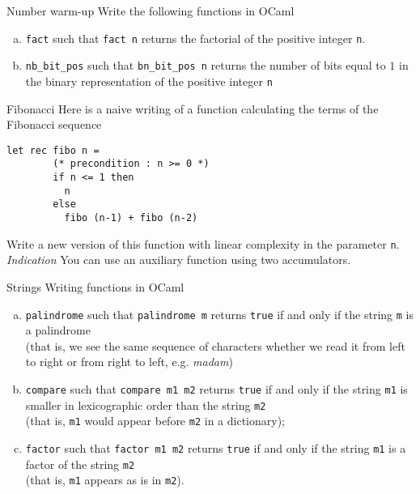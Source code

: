 \begin{problem}{Number warm-up}{}
    Write the following functions in OCaml
    
    \begin{enumerate}[(a)]
        \item \lstinline|fact| such that \lstinline|fact n| returns the factorial of the positive integer \lstinline|n|.
        
        \item \lstinline|nb_bit_pos| such that \lstinline|bn_bit_pos n| returns the number of bits equal to $1$ in the binary representation of the positive integer \lstinline|n|
    \end{enumerate}
\end{problem}

\begin{problem}{Fibonacci}{}
    Here is a naive writing of a function calculating the terms of the Fibonacci sequence
    
    \begin{lstlisting}[style=caml]
      let rec fibo n =
        (* precondition : n >= 0 *)
        if n <= 1 then 
          n
        else 
          fibo (n-1) + fibo (n-2)
\end{lstlisting}
    Write a new version of this function with linear complexity in the parameter \lstinline|n|.
    \textit{Indication} You can use an auxiliary function using two accumulators.
    
\end{problem}

\begin{problem}{Strings}{}
    Writing functions in OCaml
    \begin{enumerate}[(a)]
        \item \lstinline|palindrome| such that \lstinline|palindrome m| returns \lstinline|true| if and only if the string \lstinline|m| is a palindrome\\
        (that is, we see the same sequence of characters whether we read it from left to right
        or from right to left, e.g. \textit{madam})
        \item \lstinline|compare| such that \lstinline|compare m1 m2| returns \lstinline|true| if and only if the string \lstinline|m1| is smaller in lexicographic order than the string \lstinline|m2|\\ 
        (that is, \lstinline|m1| would appear before \lstinline|m2| in a dictionary);
        \item \lstinline|factor| such that \lstinline|factor m1 m2| returns \lstinline|true| if and only if the string \lstinline|m1| is a factor of the string \lstinline|m2|\\ 
        (that is, \lstinline|m1| appears as is in \lstinline|m2|).
    \end{enumerate}
\end{problem}

